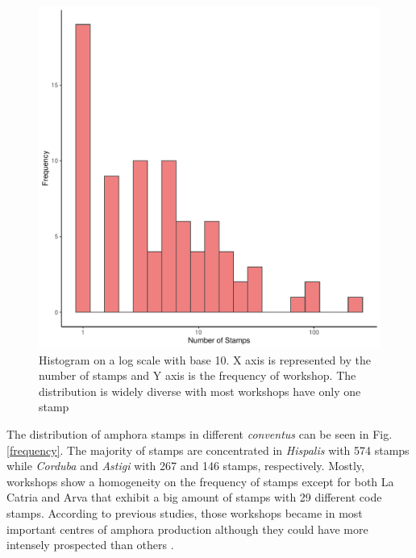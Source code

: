 \documentclass[review]{elsarticle}
\newcommand{\memo}[2]{\textcolor{#1}{#2}}
\newcommand{\xavi}[1]{\memo{magenta}{XRC: #1\\}}
\begin{document}


\begin{figure}[htp]
	\centering
\includegraphics[width=\linewidth]{figs/frequencystamp.pdf}
\caption{Histogram on a log scale with base 10. X axis is represented by the number of stamps and Y axis is the frequency of workshop. The distribution is widely diverse with most workshops have only one stamp}
\label{stamps}
\end{figure} 



The distribution of amphora stamps in different \textit{conventus} can be seen in Fig. \ref{frequency}. The majority of stamps are concentrated in \textit{Hispalis} with 574 stamps while \textit{Corduba} and \textit{Astigi} with 267 and 146 stamps, respectively. Mostly, workshops show a homogeneity on the frequency of stamps except for both La Catria and Arva that exhibit a big amount of stamps with 29 different code stamps. According to previous studies, those workshops became in most important centres of amphora production although they could have more intensely prospected than others \citep{arva_1997}.
 
\end{document}
